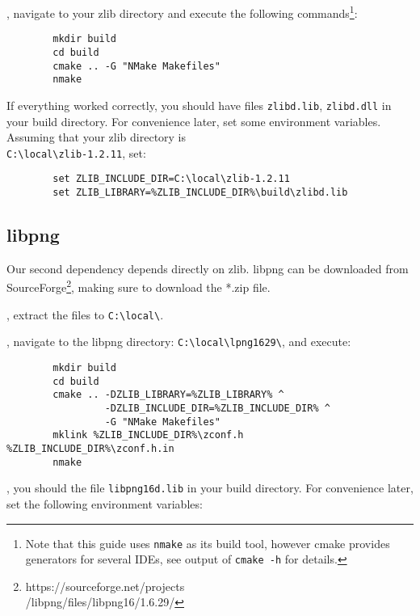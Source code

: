 \documentclass{tufte-handout}
\begin{document}
    , navigate to your zlib directory and execute the following 
    commands\footnote{Note that this guide uses \Verb|nmake| as its build tool, however cmake provides
    generators for several IDEs, see output of \Verb|cmake -h| for details.}:

    \begin{lstlisting}
        mkdir build
        cd build 
        cmake .. -G "NMake Makefiles"
        nmake
    \end{lstlisting}

    If everything worked correctly, you should have files \Verb|zlibd.lib|, \Verb|zlibd.dll| in
    your build directory.  For convenience later, set some environment variables.  Assuming that
    your zlib directory is \\
    \Verb|C:\local\zlib-1.2.11|, set:

    \begin{lstlisting}
        set ZLIB_INCLUDE_DIR=C:\local\zlib-1.2.11
        set ZLIB_LIBRARY=%ZLIB_INCLUDE_DIR%\build\zlibd.lib
    \end{lstlisting}

\subsection{libpng}

    Our second dependency depends directly on zlib.  libpng can be downloaded from 
    SourceForge\footnote{https://sourceforge.net/projects \\
    /libpng/files/libpng16/1.6.29/}, making 
    sure to download the *.zip file.

    , extract the files to \Verb|C:\local\|.

    , navigate to the libpng directory:
    \Verb|C:\local\lpng1629\|, and execute:

    \begin{lstlisting}
        mkdir build
        cd build
        cmake .. -DZLIB_LIBRARY=%ZLIB_LIBRARY% ^ 
                 -DZLIB_INCLUDE_DIR=%ZLIB_INCLUDE_DIR% ^
                 -G "NMake Makefiles"
        mklink %ZLIB_INCLUDE_DIR%\zconf.h %ZLIB_INCLUDE_DIR%\zconf.h.in
        nmake
    \end{lstlisting}

    , you should the file \Verb|libpng16d.lib| in your build directory.
    For convenience later, set the following environment variables:
\end{document}
